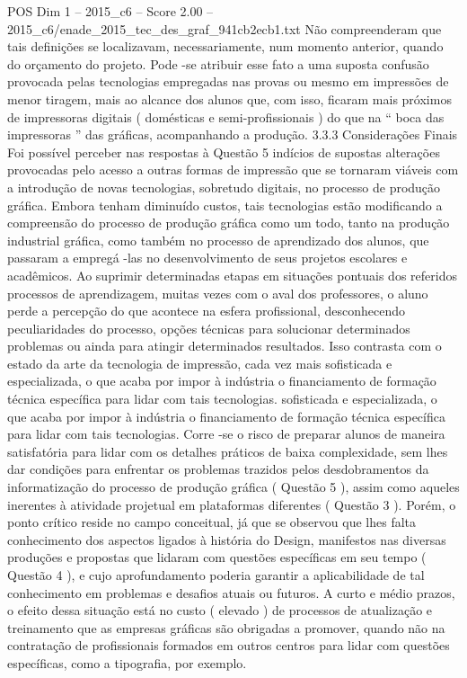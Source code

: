\begin{textsample}{POS Dim 1 – 2015\_c6 – Score 2.00 – 2015\_c6/enade\_2015\_tec\_des\_graf\_941cb2ecb1.txt}
Não compreenderam que tais definições se localizavam, necessariamente, num momento anterior, quando do orçamento do projeto.
Pode -se atribuir esse fato a uma suposta confusão provocada pelas tecnologias empregadas nas provas ou mesmo em impressões de menor tiragem, mais ao alcance dos alunos que, com isso, ficaram mais próximos de impressoras digitais ( domésticas e semi-profissionais ) do que na “ boca das impressoras ” das gráficas, acompanhando a produção. 3.3.3 Considerações Finais Foi possível perceber nas respostas à Questão 5 indícios de supostas alterações provocadas pelo acesso a outras formas de impressão que se tornaram viáveis com a introdução de novas tecnologias, sobretudo digitais, no processo de produção gráfica.
Embora tenham diminuído custos, tais tecnologias estão modificando a compreensão do processo de produção gráfica como um todo, tanto na produção industrial gráfica, como também no processo de aprendizado dos alunos, que passaram a empregá -las no desenvolvimento de seus projetos escolares e acadêmicos.
Ao suprimir determinadas etapas em situações pontuais dos referidos processos de aprendizagem, muitas vezes com o aval dos professores, o aluno perde a percepção do que acontece na esfera profissional, desconhecendo peculiaridades do processo, opções técnicas para solucionar determinados problemas ou ainda para atingir determinados resultados.
Isso contrasta com o estado da arte da tecnologia de impressão, cada vez mais sofisticada e especializada, o que acaba por impor à indústria o financiamento de formação técnica específica para lidar com tais tecnologias. sofisticada e especializada, o que acaba por impor à indústria o financiamento de formação técnica específica para lidar com tais tecnologias.
Corre -se o risco de preparar alunos de maneira satisfatória para lidar com os detalhes práticos de baixa complexidade, sem lhes dar condições para enfrentar os problemas trazidos pelos desdobramentos da informatização do processo de produção gráfica ( Questão 5 ), assim como aqueles inerentes à atividade projetual em plataformas diferentes ( Questão 3 ).
Porém, o ponto crítico reside no campo conceitual, já que se observou que lhes falta conhecimento dos aspectos ligados à história do Design, manifestos nas diversas produções e propostas que lidaram com questões específicas em seu tempo ( Questão 4 ), e cujo aprofundamento poderia garantir a aplicabilidade de tal conhecimento em problemas e desafios atuais ou futuros.
A curto e médio prazos, o efeito dessa situação está no custo ( elevado ) de processos de atualização e treinamento que as empresas gráficas são obrigadas a promover, quando não na contratação de profissionais formados em outros centros para lidar com questões específicas, como a tipografia, por exemplo.

\end{textsample}
